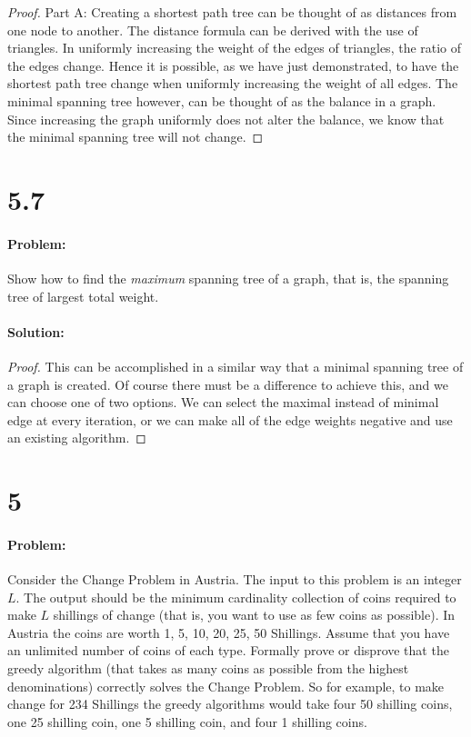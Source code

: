 \documentclass[12pt]{article}
\begin{document}
\begin{proof}
Part A:
Creating a shortest path tree can be thought of as distances from one node to another.  The distance formula can be derived with the use of triangles.  In uniformly increasing the weight of the edges of triangles, the ratio of the edges change. Hence it is possible, as we have just demonstrated, to have the shortest path tree change when uniformly increasing the weight of all edges.  The minimal spanning tree however, can be thought of as the balance in a graph.  Since increasing the graph uniformly does not alter the balance, we know that the minimal spanning tree will not change.

\end{proof}


\section*{5.7}
\paragraph{Problem:}
Show how to find the \emph{maximum} spanning tree of a graph, that is, the spanning tree of largest
total weight.

\paragraph{Solution:}
\begin{proof}
This can be accomplished in a similar way that a minimal spanning tree of a graph is created.  Of course there must be a difference to achieve this, and we can choose one of two options.  We can select the maximal instead of minimal edge at every iteration, or we can make all of the edge weights negative and use an existing algorithm.
\end{proof}

\section*{5}
\paragraph{Problem:}
Consider the Change Problem in Austria. The input to this problem is
an integer $L$. The output should be the minimum cardinality collection
of coins required to make $L$ shillings of change (that is, you want to use
as few coins as possible). In Austria the coins are worth 1, 5, 10, 20, 25,
50 Shillings. Assume that you have an unlimited number of coins of each
type. Formally prove or disprove that the greedy algorithm (that takes as
many coins as possible from the highest denominations) correctly solves
the Change Problem. So for example, to make change for 234 Shillings the
greedy algorithms would take four 50 shilling coins, one 25 shilling coin,
one 5 shilling coin, and four 1 shilling coins.
\end{document}
